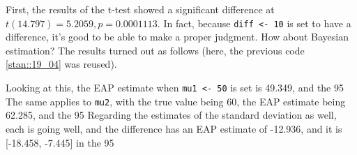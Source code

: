 \documentclass{ltjsbook}
\begin{document}
First, the results of the t-test showed a significant difference at $t(14.797)=5.2059,p=0.0001113$. In fact, because \verb|diff <- 10| is set to have a difference, it's good to be able to make a proper judgment.
How about Bayesian estimation? The results turned out as follows (here, the previous code \ref{stan::19_04} was reused).

Looking at this, the EAP estimate when \verb|mu1 <- 50| is set is 49.349, and the 95%
The same applies to \verb|mu2|, with the true value being 60, the EAP estimate being 62.285, and the 95%
Regarding the estimates of the standard deviation as well, each is going well, and the difference has an EAP estimate of -12.936, and it is [-18.458, -7.445] in the 95%
\end{document}
